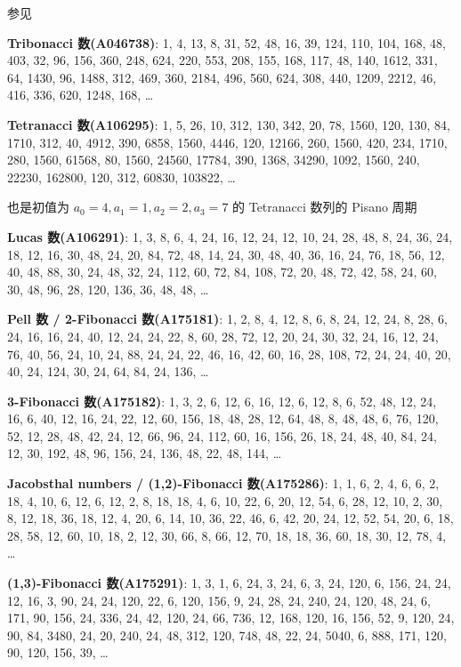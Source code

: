 \begin{enumerate}
          参见 

          \textbf{Tribonacci 数(A046738)}: 1, 4, 13, 8, 31, 52, 48, 16, 39, 124, 110, 104, 168, 48, 403, 32, 96, 156, 360, 248, 624, 220, 553, 208, 155, 168, 117, 48, 140, 1612, 331, 64, 1430, 96, 1488, 312, 469, 360, 2184, 496, 560, 624, 308, 440, 1209, 2212, 46, 416, 336, 620, 1248, 168, \dots

          \textbf{Tetranacci 数(A106295)}: 1, 5, 26, 10, 312, 130, 342, 20, 78, 1560, 120, 130, 84, 1710, 312, 40, 4912, 390, 6858, 1560, 4446, 120, 12166, 260, 1560, 420, 234, 1710, 280, 1560, 61568, 80, 1560, 24560, 17784, 390, 1368, 34290, 1092, 1560, 240, 22230, 162800, 120, 312, 60830, 103822, \dots

          也是初值为 \(a_0=4, a_1=1, a_2=2, a_3=7\) 的 Tetranacci 数列的 Pisano 周期

          \textbf{Lucas 数(A106291)}: 1, 3, 8, 6, 4, 24, 16, 12, 24, 12, 10, 24, 28, 48, 8, 24, 36, 24, 18, 12, 16, 30, 48, 24, 20, 84, 72, 48, 14, 24, 30, 48, 40, 36, 16, 24, 76, 18, 56, 12, 40, 48, 88, 30, 24, 48, 32, 24, 112, 60, 72, 84, 108, 72, 20, 48, 72, 42, 58, 24, 60, 30, 48, 96, 28, 120, 136, 36, 48, 48, \dots

          \textbf{Pell 数 / 2-Fibonacci 数(A175181)}: 1, 2, 8, 4, 12, 8, 6, 8, 24, 12, 24, 8, 28, 6, 24, 16, 16, 24, 40, 12, 24, 24, 22, 8, 60, 28, 72, 12, 20, 24, 30, 32, 24, 16, 12, 24, 76, 40, 56, 24, 10, 24, 88, 24, 24, 22, 46, 16, 42, 60, 16, 28, 108, 72, 24, 24, 40, 20, 40, 24, 124, 30, 24, 64, 84, 24, 136, \dots

          \textbf{3-Fibonacci 数(A175182)}: 1, 3, 2, 6, 12, 6, 16, 12, 6, 12, 8, 6, 52, 48, 12, 24, 16, 6, 40, 12, 16, 24, 22, 12, 60, 156, 18, 48, 28, 12, 64, 48, 8, 48, 48, 6, 76, 120, 52, 12, 28, 48, 42, 24, 12, 66, 96, 24, 112, 60, 16, 156, 26, 18, 24, 48, 40, 84, 24, 12, 30, 192, 48, 96, 156, 24, 136, 48, 22, 48, 144, \dots

          \textbf{Jacobsthal numbers / (1,2)-Fibonacci 数(A175286)}: 1, 1, 6, 2, 4, 6, 6, 2, 18, 4, 10, 6, 12, 6, 12, 2, 8, 18, 18, 4, 6, 10, 22, 6, 20, 12, 54, 6, 28, 12, 10, 2, 30, 8, 12, 18, 36, 18, 12, 4, 20, 6, 14, 10, 36, 22, 46, 6, 42, 20, 24, 12, 52, 54, 20, 6, 18, 28, 58, 12, 60, 10, 18, 2, 12, 30, 66, 8, 66, 12, 70, 18, 18, 36, 60, 18, 30, 12, 78, 4, \dots

          \textbf{(1,3)-Fibonacci 数(A175291)}: 1, 3, 1, 6, 24, 3, 24, 6, 3, 24, 120, 6, 156, 24, 24, 12, 16, 3, 90, 24, 24, 120, 22, 6, 120, 156, 9, 24, 28, 24, 240, 24, 120, 48, 24, 6, 171, 90, 156, 24, 336, 24, 42, 120, 24, 66, 736, 12, 168, 120, 16, 156, 52, 9, 120, 24, 90, 84, 3480, 24, 20, 240, 24, 48, 312, 120, 748, 48, 22, 24, 5040, 6, 888, 171, 120, 90, 120, 156, 39, \dots
\end{enumerate}

